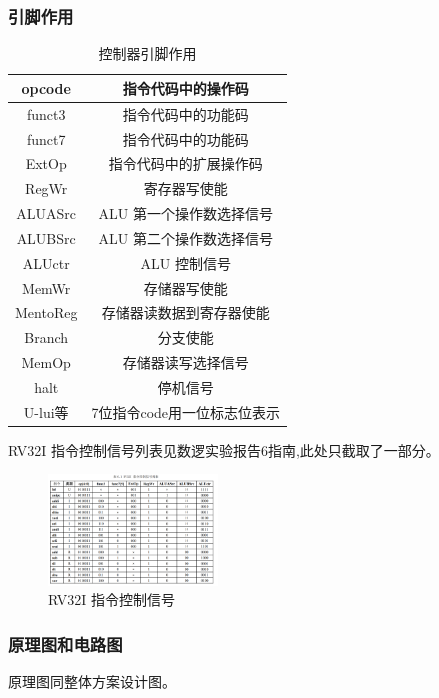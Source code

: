 \documentclass{article}
\begin{document}
    \subsubsection{引脚作用}
    \begin{table}[H]
    \centering
    \begin{tabular}{|c|c|}
        \hline
        opcode  & 指令代码中的操作码 \\ \hline
        funct3  & 指令代码中的功能码 \\ \hline
        funct7  & 指令代码中的功能码 \\ \hline
        ExtOp  & 指令代码中的扩展操作码 \\ \hline
        RegWr  & 寄存器写使能 \\ \hline
        ALUASrc  & ALU 第一个操作数选择信号 \\ \hline
        ALUBSrc  & ALU 第二个操作数选择信号 \\ \hline
        ALUctr  & ALU 控制信号 \\ \hline
        MemWr  & 存储器写使能 \\ \hline
        MentoReg  & 存储器读数据到寄存器使能 \\ \hline
        Branch  & 分支使能 \\ \hline
        MemOp  & 存储器读写选择信号 \\ \hline
        halt  & 停机信号 \\ \hline
        U-lui等 & 7位指令code用一位标志位表示 \\ \hline
    \end{tabular}
    \caption{控制器引脚作用}
    \end{table}
    RV32I 指令控制信号列表见数逻实验报告6指南,此处只截取了一部分。
    \begin{figure}[H]
    \centering
    \includegraphics[width=0.4\textwidth]{1.2.png}
    \caption{RV32I 指令控制信号}
    \end{figure}

    \subsubsection{原理图和电路图}
    原理图同整体方案设计图。
\end{document}
